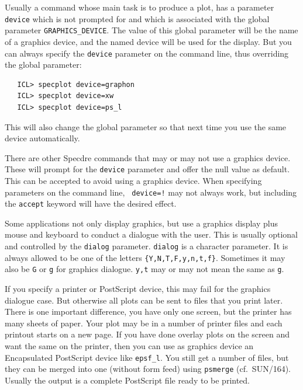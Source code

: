 \documentclass[11pt,twoside]{article}
\newcommand{\xref}[3]{#1}
\begin{document}
   Usually a command whose main task is to produce a plot, has a
   parameter {\tt device} which is not prompted for and which is
   associated with the global parameter {\tt GRAPHICS\_DEVICE}. The
   value of this global parameter will be the name of a graphics device,
   and the named device will be used for the display. But you can always
   specify the {\tt device} parameter on the command line, thus
   overriding the global parameter:

\begin{verbatim}
   ICL> specplot device=graphon
   ICL> specplot device=xw
   ICL> specplot device=ps_l
\end{verbatim}

   This will also change the global parameter so that next time you use
   the same device automatically.

   There are other Specdre commands that may or may not use a graphics
   device. These will prompt for the {\tt device} parameter and offer
   the null value as default. This can be accepted to avoid using a
   graphics device. When specifying parameters on the command line, {\tt
   device=!} may not always work, but including the {\tt accept} keyword
   will have the desired effect.

   Some applications not only display graphics, but use a graphics
   display plus mouse and keyboard to conduct a dialogue with the user.
   This is usually optional and controlled by the {\tt dialog}
   parameter.  {\tt dialog} is a character parameter.  It is always
   allowed to be one of the letters {\tt\{Y,N,T,F,y,n,t,f\}}.  Sometimes
   it may also be {\tt G} or {\tt g} for graphics dialogue.  {\tt y,t}
   may or may not mean the same as {\tt g}.

   If you specify a printer or PostScript device, this may fail for the
   graphics dialogue case.  But otherwise all plots can be sent to files
   that you print later.  There is one important difference, you have
   only one screen, but the printer has many sheets of paper.  Your plot
   may be in a number of printer files and each printout starts on a new
   page.  If you have done overlay plots on the screen and want the same
   on the printer, then you can use as graphics device an Encapsulated
   PostScript device like {\tt epsf\_l}.  You still get a number
   of files, but they can be merged into one (without form feed) using
{\tt\xref{psmerge}{sun164}{}}
   (cf.\ SUN/164).  Usually the output is a complete PostScript file
   ready to be printed.
\end{document}
